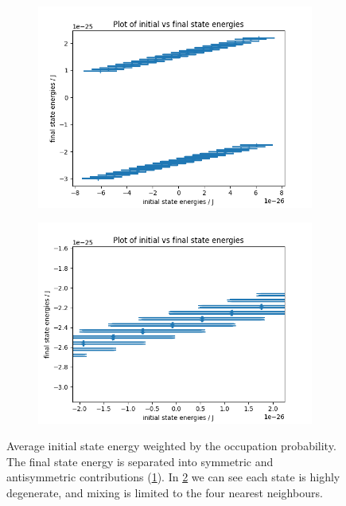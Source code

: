 \begin{figure}[htbp]
    \centering
    \begin{subfigure}{0.45\linewidth}
        \includegraphics[width=0.9\linewidth]{Figures/Simulation/Plot of single band eigenstate energy range.png}
        \label{fig:initial and final state energies of single band}
    \end{subfigure}
    \begin{subfigure}{0.45\linewidth}
        \includegraphics[width=0.9\linewidth]{Figures/Simulation/Plot of single band eigenstate energy range closeup.png}
        \label{fig:initial and final state energies of single band zoom}
    \end{subfigure}
    \caption{Average initial state energy weighted by the
        occupation  probability. The final
        state energy is separated into
        symmetric and antisymmetric
        contributions
        (\cref{fig:initial and final state energies of single band}).
        In \cref{fig:initial and final state energies of single band zoom}
        we can see each state is highly degenerate, and mixing
        is limited to the four nearest neighbours.
    }\label{fig:single band energies}
\end{figure}
